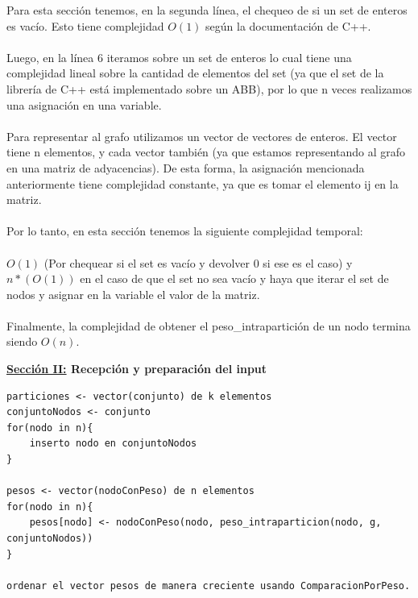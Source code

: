 \documentclass[10pt,a4paper]{article}
\begin{document}
Para esta sección tenemos, en la segunda línea, el chequeo de si un set de enteros es vacío. Esto tiene complejidad $O(1)$ según la documentación de C++.\\\\
Luego, en la línea 6 iteramos sobre un set de enteros lo cual tiene una complejidad lineal sobre la cantidad de elementos del set (ya que el set de la librería de C++ está implementado sobre un ABB), por lo que n veces realizamos una asignación en una variable.\\\\
Para representar al grafo utilizamos un vector de vectores de enteros. El vector tiene n elementos, y cada vector también (ya que estamos representando al grafo en una matriz de adyacencias). De esta forma, la asignación mencionada anteriormente tiene complejidad constante, ya que es tomar el elemento ij en la matriz.\\\\
Por lo tanto, en esta sección tenemos la siguiente complejidad temporal:\\\\
$O(1)$ (Por chequear si el set es vacío y devolver 0 si ese es el caso) y $n*(O(1))$ en el caso de que el set no sea vacío y haya que iterar el set de nodos y asignar en la variable el valor de la matriz.\\\\
Finalmente, la complejidad de obtener el peso\_intrapartición de un nodo termina siendo $O(n)$.


\textbf{\underline{Sección II:} Recepción y preparación del input} 

\begin{lstlisting}[mathescape]
particiones <- vector(conjunto) de k elementos
conjuntoNodos <- conjunto
for(nodo in n){
	inserto nodo en conjuntoNodos
}

pesos <- vector(nodoConPeso) de n elementos
for(nodo in n){
	pesos[nodo] <- nodoConPeso(nodo, peso_intraparticion(nodo, g, conjuntoNodos))
}

ordenar el vector pesos de manera creciente usando ComparacionPorPeso.
\end{lstlisting}
\end{document}
